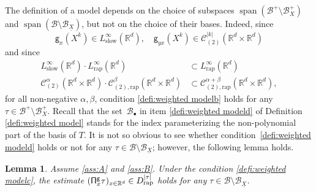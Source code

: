 \documentclass[11pt]{article}
\newcommand{\skpt}{\smallskip}
\numberwithin{equation}{section}
\newcommand{\sbullet}{{\scriptscriptstyle\bullet}}
\DeclareMathOperator{\Span}{span}
\theoremstyle{plain}
\newtheorem{lem}[thm]{Lemma}
\theoremstyle{definition}
\newcommand{\rap}{\mathrm{rap}}
\newcommand{\slow}{\mathrm{slow}}
\newcommand{\sfg}{\mathsf{g}}
\newcommand{\bbR}{\mathbb{R}}
\newcommand{\mcB}{\mathcal{B}}
\newcommand{\mcC}{\mathcal{C}}
\begin{document}
The definition of a model depends on the choice of subspaces $\Span (\mcB^+\setminus\mcB_X^+)$ and $\Span (\mcB\setminus\mcB_{\underline{X}})$, but not on the choice of their bases.
Indeed, since
\[
\sfg_x(X^k)\in L_\slow^\infty(\bbR^d),\quad \sfg_{yx}(X^k)\in\mcC_{(2)}^{|k|}(\bbR^d\times\bbR^d)
\]
and since
\begin{align*}
L_\slow^\infty(\bbR^d)\cdot L_\rap^\infty(\bbR^d)&\subset L_\rap^\infty(\bbR^d)\\
\tag*{and}\mcC_{(2)}^\alpha(\bbR^d\times\bbR^d)\cdot\mcC_{(2),\rap}^\beta(\bbR^d\times\bbR^d)&\subset\mcC_{(2),\rap}^{\alpha+\beta}(\bbR^d\times\bbR^d),
\end{align*}
for all non-negative $\alpha,\beta$, condition \eqref{defi:weighted modelb} holds for any $\tau\!\in\!\mcB^+\!\setminus\!\mcB_X^+$. Recall that the set~$\mcB_\sbullet$ in item \eqref{defi:weighted modeld} of Definition \ref{defi:weighted model} stands for the index parameterizing the non-polynomial part of the basis of $T$. It is not so obvious to see whether condition~\eqref{defi:weighted modeld} holds or not for any $\tau\in\mcB\setminus\mcB_{\underline{X}}$; however, the following lemma holds.

\skpt
\begin{lem}
Assume \eqref{ass:A} and \eqref{ass:B}.
Under the condition \eqref{defi:weighted modelc}, the estimate $({\sf\Pi}_x^{\sfg}\tau)_{x\in\bbR^d}\in D_{\rap}^{|\tau|}$ holds for any $\tau\in\mcB\setminus\mcB_{\underline{X}}$.
\end{lem}
\end{document}
